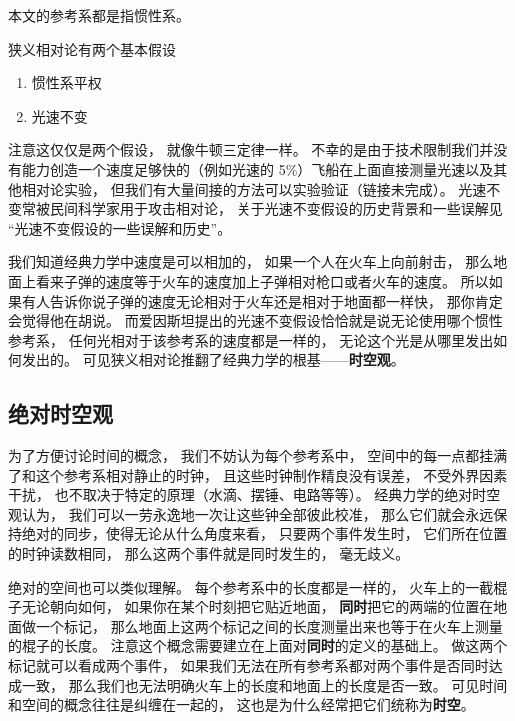 
\begin{issues}
\issueDraft
\end{issues}


本文的参考系都是指惯性系。

狭义相对论有两个基本假设
\begin{enumerate}
\item 惯性系平权
\item 光速不变
\end{enumerate}

注意这仅仅是两个假设， 就像牛顿三定律一样。 不幸的是由于技术限制我们并没有能力创造一个速度足够快的（例如光速的 5\%）飞船在上面直接测量光速以及其他相对论实验， 但我们有大量间接的方法可以实验验证（链接未完成）。 光速不变常被民间科学家用于攻击相对论， 关于光速不变假设的历史背景和一些误解见 “光速不变假设的一些误解和历史”。

我们知道经典力学中速度是可以相加的， 如果一个人在火车上向前射击， 那么地面上看来子弹的速度等于火车的速度加上子弹相对枪口或者火车的速度。 所以如果有人告诉你说子弹的速度无论相对于火车还是相对于地面都一样快， 那你肯定会觉得他在胡说。 而爱因斯坦提出的光速不变假设恰恰就是说无论使用哪个惯性参考系， 任何光相对于该参考系的速度都是一样的， 无论这个光是从哪里发出如何发出的。 可见狭义相对论推翻了经典力学的根基——\textbf{时空观}。

\subsection{绝对时空观}\label{sub_Relat0_1}
为了方便讨论时间的概念， 我们不妨认为每个参考系中， 空间中的每一点都挂满了和这个参考系相对静止的时钟， 且这些时钟制作精良没有误差， 不受外界因素干扰， 也不取决于特定的原理（水滴、摆锤、电路等等）。 经典力学的绝对时空观认为， 我们可以一劳永逸地一次让这些钟全部彼此校准， 那么它们就会永远保持绝对的同步，使得无论从什么角度来看， 只要两个事件发生时， 它们所在位置的时钟读数相同， 那么这两个事件就是同时发生的， 毫无歧义。

绝对的空间也可以类似理解。 每个参考系中的长度都是一样的， 火车上的一截棍子无论朝向如何， 如果你在某个时刻把它贴近地面， \textbf{同时}把它的两端的位置在地面做一个标记， 那么地面上这两个标记之间的长度测量出来也等于在火车上测量的棍子的长度。 注意这个概念需要建立在上面对\textbf{同时}的定义的基础上。 做这两个标记就可以看成两个事件， 如果我们无法在所有参考系都对两个事件是否同时达成一致， 那么我们也无法明确火车上的长度和地面上的长度是否一致。 可见时间和空间的概念往往是纠缠在一起的， 这也是为什么经常把它们统称为\textbf{时空}。

